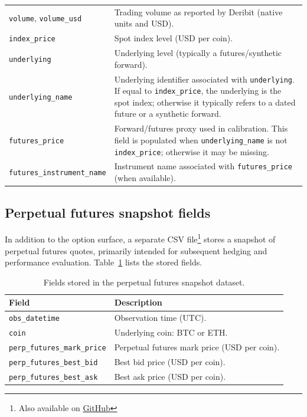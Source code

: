 \documentclass[a4paper,titlepage,12pt]{report}
\theoremstyle{plain}
\begin{document}
\begin{longtable}{@{}p{}p{}@{}}
\texttt{volume}, \texttt{volume\_usd} &
Trading volume as reported by Deribit (native units and USD). \\

\texttt{index\_price} &
Spot index level (USD per coin). \\

\texttt{underlying} &
Underlying level (typically a futures/synthetic forward). \\

\texttt{underlying\_name} &
Underlying identifier associated with \texttt{underlying}. If equal to \texttt{index\_price}, the underlying is the spot index; otherwise it typically refers to a dated future or a synthetic forward. \\

\texttt{futures\_price} &
Forward/futures proxy used in calibration. This field is populated when \texttt{underlying\_name} is not \texttt{index\_price}; otherwise it may be missing. \\

\texttt{futures\_instrument\_name} &
Instrument name associated with \texttt{futures\_price} (when available). \\

\end{longtable}

\subsection{Perpetual futures snapshot fields}\label{subsec:perp_fields}

In addition to the option surface, a separate CSV file\footnote{Also available on \href{https://github.com/znmahbub/SVCJ-Deribit-Inverse-Options-Pricer/tree/main/data}{GitHub}} stores a snapshot of perpetual futures quotes, primarily intended for subsequent hedging and performance evaluation. Table~\ref{tab:perp_fields} lists the stored fields.

\begin{table}[H]
\centering
\caption{Fields stored in the perpetual futures snapshot dataset.}\label{tab:perp_fields}
\begin{tabular}{@{}p{}p{}@{}}
\toprule
\textbf{Field} & \textbf{Description} \\
\midrule
\texttt{obs\_datetime} & Observation time (UTC). \\
\texttt{coin} & Underlying coin: BTC or ETH. \\
\texttt{perp\_futures\_mark\_price} & Perpetual futures mark price (USD per coin). \\
\texttt{perp\_futures\_best\_bid} & Best bid price (USD per coin). \\
\texttt{perp\_futures\_best\_ask} & Best ask price (USD per coin). \\
\bottomrule
\end{tabular}
\end{table}
\end{document}
